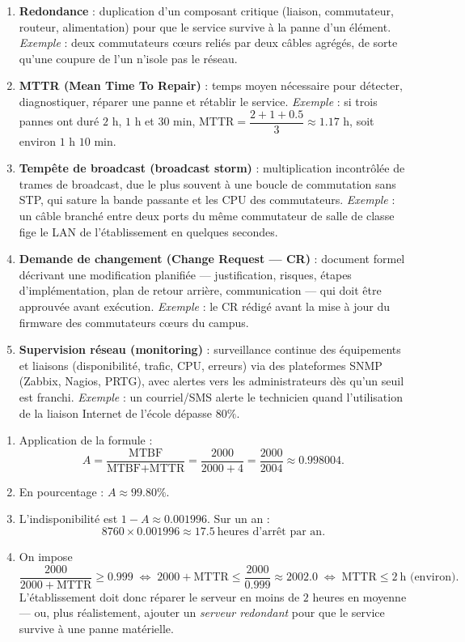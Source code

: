 \documentclass[11pt]{article}
\begin{document}
\begin{corrige}
\begin{enumerate}
\item \textbf{Redondance} : duplication d'un composant critique (liaison, commutateur, routeur, alimentation) pour que le service survive à la panne d'un élément. \emph{Exemple} : deux commutateurs cœurs reliés par deux câbles agrégés, de sorte qu'une coupure de l'un n'isole pas le réseau.
\item \textbf{MTTR (Mean Time To Repair)} : temps moyen nécessaire pour détecter, diagnostiquer, réparer une panne et rétablir le service. \emph{Exemple} : si trois pannes ont duré $2$ h, $1$ h et $30$ min, $\text{MTTR} = \dfrac{2 + 1 + 0.5}{3} \approx 1.17$ h, soit environ $1$ h $10$ min.
\item \textbf{Tempête de broadcast (broadcast storm)} : multiplication incontrôlée de trames de broadcast, due le plus souvent à une boucle de commutation sans STP, qui sature la bande passante et les CPU des commutateurs. \emph{Exemple} : un câble branché entre deux ports du même commutateur de salle de classe fige le LAN de l'établissement en quelques secondes.
\item \textbf{Demande de changement (Change Request --- CR)} : document formel décrivant une modification planifiée --- justification, risques, étapes d'implémentation, plan de retour arrière, communication --- qui doit être approuvée avant exécution. \emph{Exemple} : le CR rédigé avant la mise à jour du firmware des commutateurs cœurs du campus.
\item \textbf{Supervision réseau (monitoring)} : surveillance continue des équipements et liaisons (disponibilité, trafic, CPU, erreurs) via des plateformes SNMP (Zabbix, Nagios, PRTG), avec alertes vers les administrateurs dès qu'un seuil est franchi. \emph{Exemple} : un courriel/SMS alerte le technicien quand l'utilisation de la liaison Internet de l'école dépasse $80\%$.
\end{enumerate}
\end{corrige}

\begin{corrige}
\begin{enumerate}
\item Application de la formule :
\[ A = \frac{\text{MTBF}}{\text{MTBF}+\text{MTTR}} = \frac{2000}{2000+4} = \frac{2000}{2004} \approx 0.998004. \]
\item En pourcentage : $A \approx 99.80\%$.
\item L'indisponibilité est $1 - A \approx 0.001996$. Sur un an :
\[ 8760 \times 0.001996 \approx 17.5\ \text{heures d'arrêt par an}. \]
\item On impose
\[ \frac{2000}{2000+\text{MTTR}} \geq 0.999
\;\Longleftrightarrow\;
2000 + \text{MTTR} \leq \frac{2000}{0.999} \approx 2002.0
\;\Longleftrightarrow\;
\text{MTTR} \leq 2\ \text{h (environ)}. \]
L'établissement doit donc réparer le serveur en moins de $2$ heures en moyenne --- ou, plus réalistement, ajouter un \emph{serveur redondant} pour que le service survive à une panne matérielle.
\end{enumerate}
\end{corrige}
\end{document}
